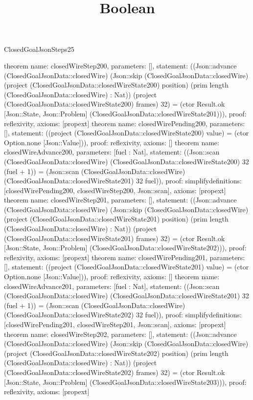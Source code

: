 \begin{lexlean}{ClosedGoalJsonSteps25}
\title{Boolean}
\begin{semanticmodule}
theorem{
 name: closedWireStep200, parameters: [],
 statement: ((Json::advance (ClosedGoalJsonData::closedWire) (Json::skip (ClosedGoalJsonData::closedWire) (project (ClosedGoalJsonData::closedWireState200) position) (prim length (ClosedGoalJsonData::closedWire) : Nat)) (project (ClosedGoalJsonData::closedWireState200) frames) 32) = (ctor Result.ok [Json::State, Json::Problem] (ClosedGoalJsonData::closedWireState201))), proof: reflexivity{}, axioms: [propext]
}
theorem{
 name: closedWirePending200, parameters: [],
 statement: ((project (ClosedGoalJsonData::closedWireState200) value) = (ctor Option.none [Json::Value])), proof: reflexivity{}, axioms: []
}
theorem{
 name: closedWireAdvance200, parameters: [fuel : Nat],
 statement: ((Json::scan (ClosedGoalJsonData::closedWire) (ClosedGoalJsonData::closedWireState200) 32 (fuel + 1)) = (Json::scan (ClosedGoalJsonData::closedWire) (ClosedGoalJsonData::closedWireState201) 32 fuel)), proof: simplify{definitions: [closedWirePending200, closedWireStep200, Json::scan]}, axioms: [propext]
}
theorem{
 name: closedWireStep201, parameters: [],
 statement: ((Json::advance (ClosedGoalJsonData::closedWire) (Json::skip (ClosedGoalJsonData::closedWire) (project (ClosedGoalJsonData::closedWireState201) position) (prim length (ClosedGoalJsonData::closedWire) : Nat)) (project (ClosedGoalJsonData::closedWireState201) frames) 32) = (ctor Result.ok [Json::State, Json::Problem] (ClosedGoalJsonData::closedWireState202))), proof: reflexivity{}, axioms: [propext]
}
theorem{
 name: closedWirePending201, parameters: [],
 statement: ((project (ClosedGoalJsonData::closedWireState201) value) = (ctor Option.none [Json::Value])), proof: reflexivity{}, axioms: []
}
theorem{
 name: closedWireAdvance201, parameters: [fuel : Nat],
 statement: ((Json::scan (ClosedGoalJsonData::closedWire) (ClosedGoalJsonData::closedWireState201) 32 (fuel + 1)) = (Json::scan (ClosedGoalJsonData::closedWire) (ClosedGoalJsonData::closedWireState202) 32 fuel)), proof: simplify{definitions: [closedWirePending201, closedWireStep201, Json::scan]}, axioms: [propext]
}
theorem{
 name: closedWireStep202, parameters: [],
 statement: ((Json::advance (ClosedGoalJsonData::closedWire) (Json::skip (ClosedGoalJsonData::closedWire) (project (ClosedGoalJsonData::closedWireState202) position) (prim length (ClosedGoalJsonData::closedWire) : Nat)) (project (ClosedGoalJsonData::closedWireState202) frames) 32) = (ctor Result.ok [Json::State, Json::Problem] (ClosedGoalJsonData::closedWireState203))), proof: reflexivity{}, axioms: [propext]
}
\end{semanticmodule}
\end{lexlean}
